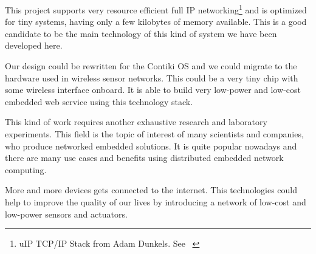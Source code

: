 This project supports  very resource efficient  full IP networking\footnote{ uIP TCP/IP Stack from Adam Dunkels. See ~\cite{Dunkels07programmingmemory-constrained} } and is optimized for tiny systems, having only a few kilobytes of memory available. 
This is a good candidate to be the main technology of this kind of system we have been developed here.

Our design could be rewritten for the Contiki OS and we could migrate to the hardware used in wireless sensor networks.
This could be a very tiny chip with some wireless interface onboard.
It is able to build very low-power and low-cost embedded web service  using this technology stack.

This kind of work requires another exhaustive research and laboratory experiments.
This field is the topic of interest of many scientists and companies, who produce networked embedded solutions.
It is quite popular nowadays and there are many use cases and benefits using distributed embedded network computing.

More and more devices gets connected to the internet. 
This technologies could help to improve the quality of our lives by
introducing a network of low-cost and low-power sensors and actuators. 


